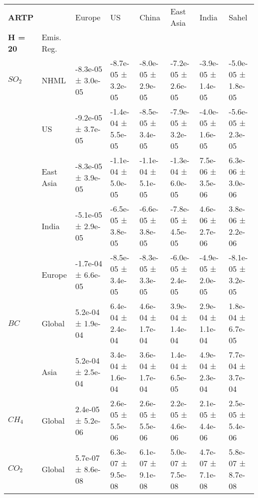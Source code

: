 \documentclass[preview]{standalone}
\newcommand{\nm}{\phantom{-}}
\begin{document}
    \tiny
    \begin{minipage}{\textwidth}
    		\setlength\tabcolsep{5pt}
    \begin{tabular}{llllllll}
\toprule
\textbf{ARTP}        &        &               Europe &                   US &                China &            East Asia &                India &                Sahel \\
\textbf{H = 20}  & Emis. Reg. &                      &                      &                      &                      &                      &                      \\
\midrule
$SO_2$ & NHML &  -8.3e-05 ±  3.0e-05 &  -8.7e-05 ±  3.2e-05 &  -8.0e-05 ±  2.9e-05 &  -7.2e-05 ±  2.6e-05 &  -3.9e-05 ±  1.4e-05 &  -5.0e-05 ±  1.8e-05 \\
       & US &  -9.2e-05 ±  3.7e-05 &  -1.4e-04 ±  5.5e-05 &  -8.5e-05 ±  3.4e-05 &  -7.9e-05 ±  3.2e-05 &  -4.0e-05 ±  1.6e-05 &  -5.6e-05 ±  2.3e-05 \\
       & East Asia &  -8.3e-05 ±  3.9e-05 &  -1.1e-04 ±  5.0e-05 &  -1.1e-04 ±  5.1e-05 &  -1.3e-04 ±  6.0e-05 &   \nm7.5e-06 ±  3.5e-06 &   \nm6.3e-06 ±  3.0e-06 \\
       & India &  -5.1e-05 ±  2.9e-05 &  -6.5e-05 ±  3.8e-05 &  -6.6e-05 ±  3.8e-05 &  -7.8e-05 ±  4.5e-05 &   \nm4.6e-06 ±  2.7e-06 &   \nm3.8e-06 ±  2.2e-06 \\
       & Europe &  -1.7e-04 ±  6.6e-05 &  -8.5e-05 ±  3.4e-05 &  -8.3e-05 ±  3.3e-05 &  -6.0e-05 ±  2.4e-05 &  -4.9e-05 ±  2.0e-05 &  -8.1e-05 ±  3.2e-05 \\
\cmidrule(lr){1-8}
$BC$ & Global &   \nm5.2e-04 ±  1.9e-04 &   \nm6.4e-04 ±  2.4e-04 &   \nm4.6e-04 ±  1.7e-04 &   \nm3.9e-04 ±  1.4e-04 &   \nm2.9e-04 ±  1.1e-04 &   \nm1.8e-04 ±  6.7e-05 \\
       & Asia &   \nm5.2e-04 ±  2.5e-04 &   \nm3.4e-04 ±  1.6e-04 &   \nm3.6e-04 ±  1.7e-04 &   \nm1.4e-04 ±  6.5e-05 &   \nm4.9e-04 ±  2.3e-04 &   \nm7.7e-04 ±  3.7e-04 \\
\cmidrule(lr){1-8}
$CH_4$ & Global &   \nm2.4e-05 ±  5.2e-06 &   \nm2.6e-05 ±  5.5e-06 &   \nm2.6e-05 ±  5.5e-06 &   \nm2.2e-05 ±  4.6e-06 &   \nm2.1e-05 ±  4.4e-06 &   \nm2.5e-05 ±  5.4e-06 \\
\cmidrule(lr){1-8}
$CO_2$ & Global &   \nm5.7e-07 ±  8.6e-08 &   \nm6.3e-07 ±  9.5e-08 &   \nm6.1e-07 ±  9.1e-08 &   \nm5.0e-07 ±  7.5e-08 &   \nm4.7e-07 ±  7.1e-08 &   \nm5.8e-07 ±  8.7e-08 \\
\bottomrule
\end{tabular}

    \end{minipage}
    
\end{document}
